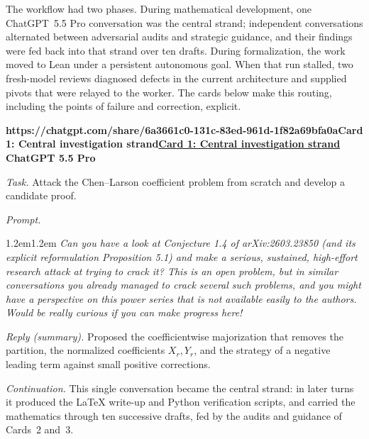 \documentclass[11pt]{article}
\theoremstyle{definition}
\theoremstyle{remark}
\newenvironment{haicard}[3][]{%
  \par\medskip\noindent
  \begin{lrbox}{\haibox}%
  \begin{minipage}{\dimexpr\linewidth-2\fboxsep-2\fboxrule\relax}%
    \small
    {\sffamily\bfseries
      \def\haiurl{#1}%
      \ifx\haiurl\empty #2\else\href{#1}{\textcolor{cardlink}{#2}}\fi
      \hfill #3}\par\vspace{0.45em}%
}{%
  \end{minipage}%
  \end{lrbox}%
  \fbox{\usebox{\haibox}}%
  \par\medskip
}
\newcommand{\haifield}[1]{\textit{#1.}\enspace\ignorespaces}
\newcommand{\haiprompt}[1]{\par\vspace{0.2em}\leftskip1.2em\rightskip1.2em\relax
  \small\itshape #1\par\leftskip0pt\rightskip0pt\vspace{0.2em}}
\begin{document}
The workflow had two phases.  During mathematical development, one
ChatGPT~5.5 Pro conversation was the central strand; independent conversations
alternated between adversarial audits and strategic guidance, and their
findings were fed back into that strand over ten drafts.  During formalization,
the work moved to Lean under a persistent autonomous goal.  When that run
stalled, two fresh-model reviews diagnosed defects in the current architecture
and supplied pivots that were relayed to the worker.  The cards below make this
routing, including the points of failure and correction, explicit.

\begin{haicard}[https://chatgpt.com/share/6a3661c0-131c-83ed-961d-1f82a69bfa0a]{Card 1: Central investigation strand}{ChatGPT 5.5 Pro}
\haifield{Task} Attack the Chen--Larson coefficient problem from scratch and
develop a candidate proof.\par
\haifield{Prompt} \haiprompt{Can you have a look at Conjecture 1.4 of
\textup{arXiv:2603.23850} (and its explicit reformulation Proposition 5.1) and
make a serious, sustained, high-effort research attack at trying to crack it?
This is an open problem, but in similar conversations you already managed to
crack several such problems, and you might have a perspective on this power
series that is not available easily to the authors. Would be really curious if
you can make progress here!}
\haifield{Reply (summary)} Proposed the coefficientwise majorization that
removes the partition, the normalized coefficients $X_r,Y_r$, and the strategy
of a negative leading term against small positive corrections.\par
\haifield{Continuation} This single conversation became the central strand: in
later turns it produced the \LaTeX{} write-up and Python verification scripts,
and carried the mathematics through ten successive drafts, fed by the audits and
guidance of Cards~2 and~3.\par
\end{haicard}
\end{document}
